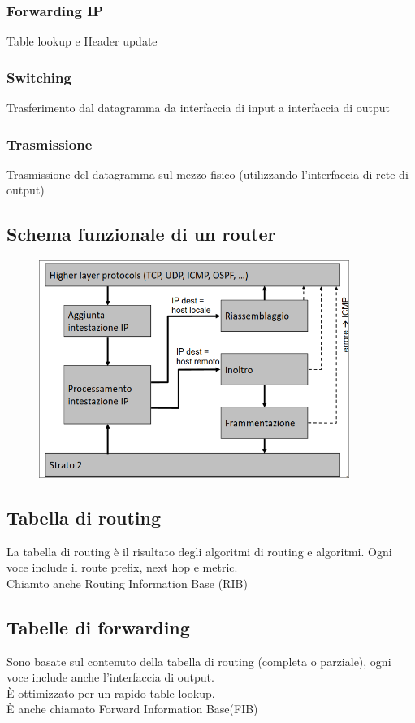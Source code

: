 \documentclass{report}
\begin{document}
                \subsubsection{Forwarding IP}
                    Table lookup e Header update
                \subsubsection{Switching}
                    Trasferimento dal datagramma da interfaccia di input a interfaccia di output
                \subsubsection{Trasmissione}
                    Trasmissione del datagramma sul mezzo fisico (utilizzando l'interfaccia di rete di output)
            \subsection{Schema funzionale di un router}
                \begin{figure}[H]
                    \includegraphics[width=0.9\textwidth]{3/schRou.png}
                \end{figure}
            \subsection{Tabella di routing}
                La tabella di routing è il risultato degli algoritmi di routing e algoritmi. Ogni voce include il route prefix, next hop  e metric.
                \\
                Chiamto anche Routing Information Base (RIB)
            \subsection{Tabelle di forwarding}
                Sono basate sul contenuto della tabella di routing (completa o parziale), ogni voce include anche l'interfaccia di output.
                \\
                È ottimizzato per un rapido table lookup. 
                \\
                È anche chiamato Forward Information Base(FIB)
\end{document}
